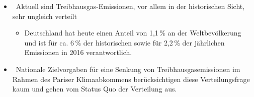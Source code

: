 \begin{frame}
{\begin{itemize}
\begin{itemize}
          \item[\rightarrow] Werden historische Emissionen der Länder berücksichtigt?
        \end{itemize}
        \item[] Aktuell sind Treibhausgas-Emissionen, vor allem in der historischen Sicht, sehr ungleich verteilt
        \begin{itemize}
          \item[\rightarrow] Deutschland hat heute einen Anteil von 1,1\,\% an der Weltbevölkerung und ist für ca. 6\,\% der historischen sowie für 2,2\,\% der jährlichen Emissionen in 2016 verantwortlich.
        \end{itemize}
        \item[] Nationale Zielvorgaben für eine Senkung von Treibhausgasemissionen im Rahmen des Pariser Klimaabkommens berücksichtigen diese Verteilungsfrage kaum und gehen vom Status Quo der Verteilung aus.
      \end{itemize}
    }
\end{frame}
